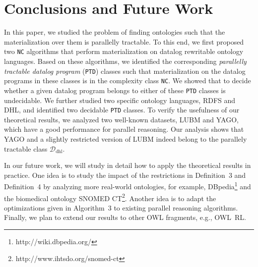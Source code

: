 \documentclass{article}
\begin{document}
\section{Conclusions and Future Work}

In this paper, we studied the problem of finding ontologies such that the materialization over them is parallelly tractable. To this end,
we first proposed two \texttt{NC} algorithms that perform materialization on datalog rewritable ontology languages.
Based on these algorithms, we identified the corresponding \emph{parallelly tractable datalog program} (\texttt{PTD}) classes such that materialization on the datalog programs in these classes is in the complexity class \texttt{NC}.
We showed that to decide whether a given datalog program belongs to either of these \texttt{PTD} classes is undecidable. We further studied two specific ontology languages, RDFS and DHL, and identified two decidable \texttt{PTD} classes. To verify the usefulness of our theoretical results, we analyzed two well-known datasets, LUBM and YAGO,
which have a good performance for parallel reasoning. Our analysis shows that YAGO and a
slightly restricted version of LUBM indeed belong to the parallely tractable class  $\mathcal{D}_{\text{dhl}}$.

In our future work, we will study in detail how to apply the theoretical results in practice.
One idea is to study the impact of the restrictions in Definition~3 and Definition~4 by analyzing more real-world ontologies,
for example, DBpedia\footnote{http://wiki.dbpedia.org/} and the biomedical ontology SNOMED CT\footnote{http://www.ihtsdo.org/snomed-ct}.
Another idea is to adapt the optimizations given in Algorithm~3 to existing parallel reasoning algorithms.
Finally, we plan to extend our results to other OWL fragments, e.g., OWL~RL.

\clearpage



\end{document}

